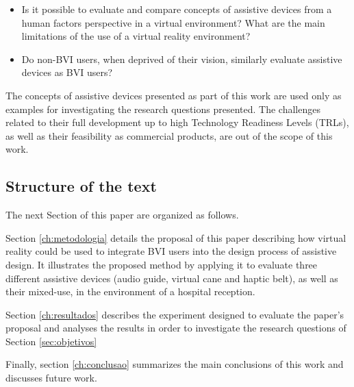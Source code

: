 \begin{itemize}
   \item Is it possible to evaluate and compare concepts of assistive devices from a human factors perspective in a virtual environment? What are the main limitations of the use of a virtual reality environment? \label{itm:obj_first}
   \item Do non-BVI users, when deprived of their vision, similarly evaluate assistive devices as BVI users? \label{itm:obj_second}
\end{itemize}


The concepts of assistive devices presented as part of this work are used only as examples for investigating the research questions presented. The challenges related to their full development up to high Technology Readiness Levels (TRLs), as well as their feasibility as commercial products, are out of the scope of this work.


\subsection*{Structure of the text}

The next Section of this paper are organized as follows.

Section \ref{ch:metodologia} details the proposal of this paper describing how virtual reality could be used to integrate BVI users into the design process of assistive design. It illustrates the proposed method by applying it to evaluate three different assistive devices (audio guide, virtual cane and haptic belt), as well as their mixed-use, in the environment of a hospital reception. 

Section \ref{ch:resultados} describes the experiment designed to evaluate the paper's proposal and analyses the results in order to investigate the research questions of Section \ref{sec:objetivos}

Finally, section \ref{ch:conclusao} summarizes the main conclusions of this work and discusses future work.
